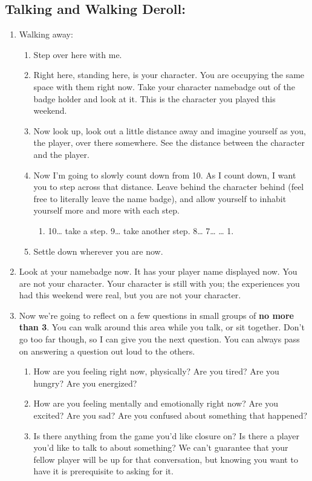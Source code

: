 \documentclass[green]{GL2020}
\begin{document}
\subsection*{Talking and Walking Deroll:}
\begin{enumerate}
	\item Walking away:
	\begin{enumerate}
		\item Step over here with me. 
		\item Right here, standing here, is your character. You are occupying the same space with them right now. Take your character namebadge out of the badge holder and look at it. This is the character you played this weekend.
		\item Now look up, look out a little distance away and imagine yourself as you, the player, over there somewhere. See the distance between the character and the player.
		\item Now I’m going to slowly count down from 10. As I count down, I want you to step across that distance. Leave behind the character behind (feel free to literally leave the name badge), and allow yourself to inhabit yourself more and more with each step.
		\begin{enumerate}
			\item 10… take a step. 9… take another step. 8… 7… … 1.
		\end{enumerate}
		\item Settle down wherever you are now.
	\end{enumerate}
	\item Look at your namebadge now. It has your player name displayed now. You are not your character. Your character is still with you; the experiences you had this weekend were real, but you are not your character.
	\item Now we’re going to reflect on a few questions in small groups of \textbf{no more than 3}. You can walk around this area while you talk, or sit together. Don’t go too far though, so I can give you the next question. You can always pass on answering a question out loud to the others.
	\begin{enumerate}
		\item How are you feeling right now, physically? Are you tired? Are you hungry? Are you energized?
		\item How are you feeling mentally and emotionally right now? Are you excited? Are you sad? Are you confused about something that happened?
		\item Is there anything from the game you’d like closure on? Is there a player you’d like to talk to about something? We can’t guarantee that your fellow player will be up for that conversation, but knowing you want to have it is prerequisite to asking for it.

\end{enumerate}
\end{enumerate}
\end{document}
